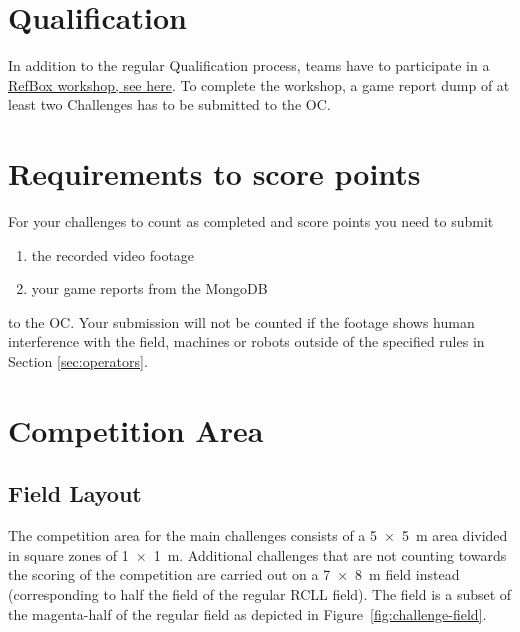 \documentclass[12pt,twoside]{article}
\newcommand{\reffig}[1]{Figure~\ref{#1}}
\begin{document}
\section{Qualification}
\label{sec:qualification}
In addition to the regular Qualification process, teams have to participate
in a \href{https://fh-aachen.sciebo.de/s/Qkm7VfIIEIIJk1d}{RefBox workshop, see here}.
To complete the workshop, a game report dump of at least two Challenges
has to be submitted to the \acf{OC}.

\section{Requirements to score points}
\label{sec:scoring}
For your challenges to count as completed and score points you need to submit
\begin{enumerate}
	\item the recorded video footage
	\item your game reports from the MongoDB
\end{enumerate}
to the OC.
Your submission will not be counted if the footage shows human
interference with the field, machines or robots outside of
the specified rules in Section \ref{sec:operators}.

\section{Competition Area}
\subsection{Field Layout}
The competition area for the main challenges consists of a \SI{5 x 5}{\metre}
area divided in square zones of \SI{1 x 1}{\metre}. Additional challenges that
are not counting towards the scoring of the competition are carried out on
a \SI{7 x 8}{\metre} field instead (corresponding to half the field of the
regular \ac{RCLL} field).
The field is a subset of the magenta-half of the regular field as depicted
in \reffig{fig:challenge-field}.
\end{document}
